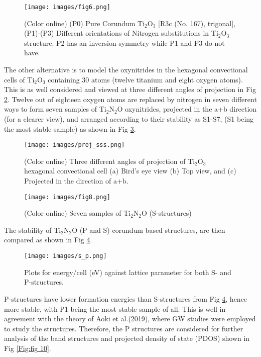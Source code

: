 \documentclass[aps,prb,superscriptaddress,twocolumn,floatfix,showpacs,amsmath]{revtex4-1}
\begin{document}
\begin{figure}[H]
    \centering
    \texttt{[image: images/fig6.png]}
    \caption{(Color online) (P0) Pure Corundum Ti$_{2}$O$_{3}$ [R3c (No. 167), trigonal],(P1)-(P3) Different orientations of Nitrogen substitutions in Ti$_{2}$O$_{3}$ structure. P2 has an inversion symmetry while P1 and P3 do not have.}
    \label{Fig:6}
\end{figure} 

The other alternative is to model the oxynitrides in the hexagonal convectional cells of Ti$_{2}$O$_{3}$ containing 30 atoms (twelve titanium and eight oxygen atoms)\cite{aoki2019insulating}. This is as well considered and viewed at three different angles of projection in Fig \ref{Fig:7}.
Twelve out of eighteen oxygen atoms are replaced by nitrogen in seven different ways to form seven samples of Ti$_{2}$N$_{2}$O oxynitrides, projected in the a+b direction (for a clearer view), and arranged according to their stability as S1-S7, (S1 being the most stable sample) as shown in Fig \ref{Fig:8}. 

\begin{figure}[H]
    \centering
    \texttt{[image: images/proj\_sss.png]}
    \caption{(Color online) Three different angles of projection of Ti$_{2}$O$_{3}$ hexagonal convectional cell (a) Bird's eye view (b) Top view, and (c) Projected in the direction of a+b.}
    \label{Fig:7}
\end{figure}

\begin{figure}[H]
    \centering
    \texttt{[image: images/fig8.png]}
    \caption{(Color online) Seven samples of Ti$_{2}$N$_{2}$O (S-structures)}
    \label{Fig:8}
\end{figure}

The stability of Ti$_{2}$N$_{2}$O (P and S) corundum based structures, are then compared as shown in Fig \ref{Fig:9}.

\begin{figure}[h]
    \centering
    \texttt{[image: images/s\_p.png]}
    \caption{Plots for energy/cell (eV) against lattice parameter for both S- and P-structures.}
    \label{Fig:9}
\end{figure}

P-structures have lower formation energies than S-structures from Fig \ref{Fig:9}, hence more stable, with P1 being the most stable sample of all. This is well in agreement with the theory of Aoki et al.(2019)\cite{aoki2019insulating}, where GW studies were employed to study the structures. Therefore, the P structures are considered for further analysis of the band structures and projected density of state (PDOS) shown in Fig \ref{Fig:fig 10}.
\end{document}
